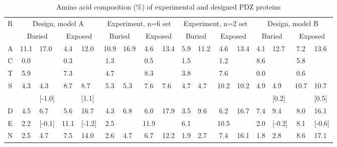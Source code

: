 \documentclass[12pt]{article}
\begin{document}
\begin{table}
\caption{Amino acid composition (\%) of experimental and designed PDZ proteins} \label{tab:freqs}
\hspace*{-1.5cm}
\small
\begin{tabular}{c|clcl|clcl|clcl|clcl} \hline \hline
\multirow{2}{*}{R} & \multicolumn{4}{c|}{Design, model A}& \multicolumn{4}{c|}{Experiment, n=6 set}& \multicolumn{4}{c|}{Experiment, n=2 set}
 & \multicolumn{4}{c}{Design, model B} \\
 & \multicolumn{2}{c}{Buried} & \multicolumn{2}{c|}{Exposed} & \multicolumn{2}{c}{Buried} & \multicolumn{2}{c|}{Exposed} 
 & \multicolumn{2}{c}{Buried} 
 & \multicolumn{2}{c|}{Exposed} & \multicolumn{2}{c}{Buried} & \multicolumn{2}{c}{Exposed} \\ \hline
A & 11.1 & \multirow{2}{*}{17.0} & 4.4 & \multirow{2}{*}{12.0} & 10.9 & \multirow{3}{*}{16.9} & 4.6 & \multirow{3}{*}{13.4} & 5.9 & \multirow{3}{*}{11.2} 
    & 4.6 & \multirow{3}{*}{13.4} & 4.1 & \multirow{2}{*}{12.7} & 7.2 & \multirow{2}{*}{13.6}\\
C & 0.0 & \multirow{2}{*}{[0.1]} & 0.3 & \multirow{2}{*}{[-1.4]} & 1.3 & & 0.5 & & 1.5 & & 1.2 & & 8.6 & \multirow{2}{*}{[1.5]} & 5.8 & \multirow{2}{*}{[0.2]}\\
T & 5.9 & & 7.3 & & 4.7 & & 8.3 & & 3.8 & & 7.6 & & 0.0 & & 0.6 & \\
\hline
\multirow{2}{*}{S}  & \multirow{2}{*}{4.3} & 4.3 & \multirow{2}{*}{8.7} & 8.7 & \multirow{2}{*}{5.3} & \multirow{2}{*}{5.3} & \multirow{2}{*}{7.6} & \multirow{2}{*}{7.6} & \multirow{2}{*}{4.7} & \multirow{2}{*}{4.7} & \multirow{2}{*}{10.2} & \multirow{2}{*}{10.2} & \multirow{2}{*}{4.9} & 4.9 & \multirow{2}{*}{10.7} & 10.7\\
 &  & [-1.0] &  & [1.1] &  &  &  &  &  &  &  &  &  & [0.2] &  & [0.5]\\
\hline
D & 4.5 & \multirow{1}{*}{6.7} & 5.6 & \multirow{1}{*}{16.7} & 4.3 & \multirow{2}{*}{6.8} & 6.0 & \multirow{2}{*}{17.9} & 3.5 & \multirow{2}{*}{9.6} & 6.2 
    & \multirow{2}{*}{16.7} & 7.4 & \multirow{1}{*}{9.4} & 8.0 & \multirow{1}{*}{16.1}\\
E & 2.2 & [-0.1] & 11.1 & [-1.2] & 2.5 & & 11.9 & & 6.1 & & 10.5 & & 2.0 & [-0.2] & 8.1 & [-0.6]\\
\hline
N & 2.5 & \multirow{1}{*}{4.7} & 7.5 & \multirow{1}{*}{14.0} & 2.6 & \multirow{2}{*}{4.7} & 6.7 & \multirow{2}{*}{12.2} & 1.9 & \multirow{2}{*}{2.7} & 7.4 
    & \multirow{2}{*}{16.1} & 1.8 & \multirow{1}{*}{2.8} & 8.6 & \multirow{1}{*}{17.1}\\

\end{tabular}
\end{table}
\end{document}

